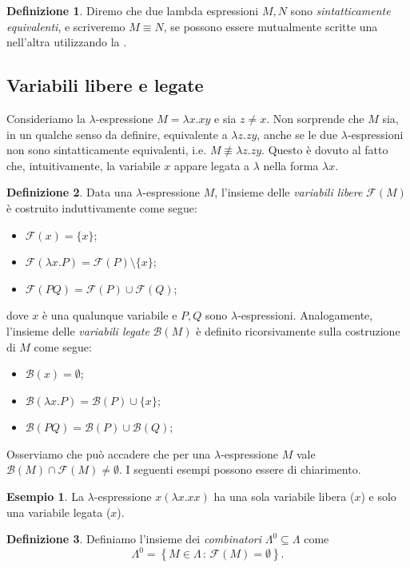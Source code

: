 \documentclass[a4paper,11pt]{article}
\theoremstyle{definition}
\newtheorem{defn}{Definizione}
\newtheorem{esempio}{Esempio}
\newcommand{\FF}{\mathcal{F}}
\newcommand{\BB}{\mathcal{B}}
\begin{document}
\begin{defn}
  Diremo che due lambda espressioni $M,N$ sono \textit{sintatticamente
  equivalenti}, e
  scriveremo $M\equiv N$, se possono essere mutualmente scritte una
  nell'altra utilizzando la .
\end{defn}
\subsection{Variabili libere e legate}
Consideriamo la $\lambda$-espressione $M=\lambda x.xy$ e sia $z\ne x$. Non sorprende che $M$
sia, in un qualche senso da definire, equivalente a $\lambda z.zy$, anche se le due
$\lambda$-espressioni non sono sintatticamente equivalenti, i.e. $M\not\equiv
\lambda z.zy$. Questo è dovuto al fatto che, intuitivamente, la variabile $x$
appare legata a $\lambda$ nella forma $\lambda x$.
\begin{defn}
  Data una $\lambda$-espressione $M$, l'insieme delle \textit{variabili
  libere} $\FF(M)$ è costruito induttivamente come segue:
  \begin{itemize}
    \item $\FF(x)=\{x\}$;
    \item $\FF(\lambda x.P)=\FF(P)\setminus\{x\}$;
    \item $\FF(PQ)=\FF(P)\cup\FF(Q)$;
  \end{itemize}
  dove $x$ è una qualunque variabile e $P,Q$ sono $\lambda$-espressioni.
  Analogamente, l'insieme delle \textit{variabili legate} $\BB(M)$ è definito
  ricorsivamente sulla costruzione di $M$ come segue:
  \begin{itemize}
    \item $\BB(x)=\emptyset$;
    \item $\BB(\lambda x.P) = \BB(P)\cup \{x\}$;
    \item $\BB(PQ)=\BB(P)\cup\BB(Q)$;
  \end{itemize}
\end{defn}

Osserviamo che può accadere che per una $\lambda$-espressione $M$ vale
$\BB(M)\cap\FF(M)\ne\emptyset$. I seguenti esempi possono essere di
chiarimento.

\begin{esempio}
  La $\lambda$-espressione $x(\lambda x.xx)$ ha una sola variabile libera
  ($x$) e solo una variabile legata ($x$).
\end{esempio}

\begin{defn}
  Definiamo l'insieme dei \textit{combinatori} $\Lambda^0\subseteq\Lambda$ come 
  \begin{equation}
    \Lambda^0 =\left\{ M\in\Lambda\,:\, \FF(M)=\emptyset \right\}.
  \end{equation}
\end{defn}
\end{document}
